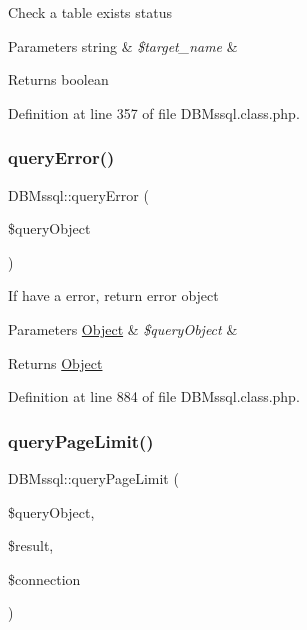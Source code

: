 Check a table exists status 
\begin{DoxyParams}[1]{Parameters}
string & {\em \$target\+\_\+name} & \\
\hline
\end{DoxyParams}
\begin{DoxyReturn}{Returns}
boolean 
\end{DoxyReturn}


Definition at line 357 of file D\+B\+Mssql.\+class.\+php.

\hypertarget{classDBMssql_adeea6fd6090140a4b81051c5ff68cdfe}{}\label{classDBMssql_adeea6fd6090140a4b81051c5ff68cdfe} 
\subsubsection{\texorpdfstring{query\+Error()}{queryError()}}
{\footnotesize\ttfamily D\+B\+Mssql\+::query\+Error (\begin{DoxyParamCaption}\item[{}]{\$query\+Object }\end{DoxyParamCaption})}

If have a error, return error object 
\begin{DoxyParams}[1]{Parameters}
\hyperlink{classObject}{Object} & {\em \$query\+Object} & \\
\hline
\end{DoxyParams}
\begin{DoxyReturn}{Returns}
\hyperlink{classObject}{Object} 
\end{DoxyReturn}


Definition at line 884 of file D\+B\+Mssql.\+class.\+php.

\hypertarget{classDBMssql_a5a63ce969c396b656ac50e2251e798b9}{}\label{classDBMssql_a5a63ce969c396b656ac50e2251e798b9} 
\subsubsection{\texorpdfstring{query\+Page\+Limit()}{queryPageLimit()}}
{\footnotesize\ttfamily D\+B\+Mssql\+::query\+Page\+Limit (\begin{DoxyParamCaption}\item[{}]{\$query\+Object,  }\item[{}]{\$result,  }\item[{}]{\$connection }\end{DoxyParamCaption})}

